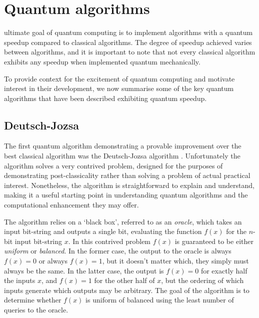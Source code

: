 %
%

\section{Quantum algorithms} \label{sec:quantum_algs}

 ultimate goal of quantum computing is to implement algorithms with a quantum speedup compared to classical algorithms. The degree of speedup achieved varies between algorithms, and it is important to note that not every classical algorithm exhibits any speedup when implemented quantum mechanically.

To provide context for the excitement of quantum computing and motivate interest in their development, we now summarise some of the key quantum algorithms that have been described exhibiting quantum speedup.

%
%

\subsection{Deutsch-Jozsa} 

The first quantum algorithm demonstrating a provable improvement over the best classical algorithm was the Deutsch-Jozsa algorithm \cite{bib:DeutschJozsa92}. Unfortunately the algorithm solves a very contrived problem, designed for the purposes of demonstrating post-classicality rather than solving a problem of actual practical interest. Nonetheless, the algorithm is straightforward to explain and understand, making it a useful starting point in understanding quantum algorithms and the computational enhancement they may offer.

The algorithm relies on a `black box', referred to as an \textit{oracle}, which takes an input bit-string and outputs a single bit, evaluating the function $f(x)$ for the $n$-bit input bit-string $x$. In this contrived problem $f(x)$ is guaranteed to be either \textit{uniform} or \textit{balanced}. In the former case, the output to the oracle is always \mbox{$f(x)=0$} or always \mbox{$f(x)=1$}, but it doesn't matter which, they simply must always be the same. In the latter case, the output is \mbox{$f(x)=0$} for exactly half the inputs $x$, and \mbox{$f(x)=1$} for the other half of $x$, but the ordering of which inputs generate which outputs may be arbitrary. The goal of the algorithm is to determine whether $f(x)$ is uniform of balanced using the least number of queries to the oracle.

